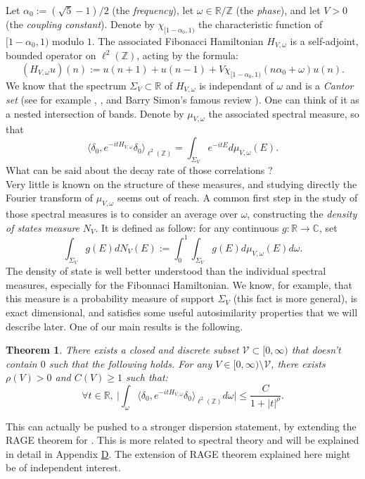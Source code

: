 \documentclass[a4paper]{article}
\newtheorem{theorem}{Theorem}[section]
\theoremstyle{definition}
\begin{document}
Let $\alpha_0 := (\sqrt{5}-1)/2$ (the \emph{frequency}), let $\omega \in \mathbb{R}/\mathbb{Z}$ (the \emph{phase}), and let $V>0$ (the \emph{coupling constant}). Denote by $\chi_{[1-\alpha_0,1)}$ the characteristic function of $[1-\alpha_0,1) \text{ modulo } 1$. The associated Fibonacci Hamiltonian $H_{V,\omega}$ is a self-adjoint, bounded operator on $\ell^2(\mathbb{Z})$, acting by the formula:
$$ (H_{V,\omega} u)(n) := u(n+1) + u(n-1) + V \chi_{[1-\alpha_0,1)}(n \alpha_0 + \omega)u(n). $$
We know that the spectrum $\Sigma_V \subset \mathbb{R}$ of $H_{V,\omega}$ is independant of $\omega$ and is a \emph{Cantor set} (see for example \cite{DF22}, \cite{DGY16}, and Barry Simon's famous review \cite{Si82}). One can think of it as a nested intersection of bands.
Denote by $\mu_{V,\omega}$ the associated spectral measure, so that
$$ \langle \delta_0, e^{-itH_{V,\omega}} \delta_0\rangle_{\ell^2(\mathbb{Z})} = \int_{\Sigma_{V}} e^{-i t E} d\mu_{V,\omega}(E). $$
What can be said about the decay rate of those correlations ? \\
Very little is known on the structure of these measures, and studying directly the Fourier transform of $\mu_{V,\omega}$ seems out of reach. A common first step in the study of those spectral measures is to consider an average over $\omega$, constructing the \emph{density of states measure} $N_V$. It is defined as follow: for any continuous $g:\mathbb{R} \rightarrow \mathbb{C}$, set
$$ \int_{\Sigma_V} g(E) dN_V(E) := \int_{0}^1 \int_{\Sigma_V} g(E) d\mu_{V,\omega}(E) d\omega. $$
The density of state is well better understood than the individual spectral measures, especially for the Fibonnaci Hamiltonian. We know, for example, that this measure is a probability measure of support $\Sigma_V$ (this fact is more general), is exact dimensional, and satisfies some useful autosimilarity properties that we will describe later. One of our main results is the following.

\begin{theorem}\label{th:IDS1}
There exists a closed and discrete subset $\mathcal{V}\subset [0,\infty)$ that doesn't contain $0$ such that the following holds. For any $V \in [0,\infty) \setminus \mathcal{V}$, there exists $\rho(V)>0$ and $C(V) \geq 1$ such that:
$$ \forall t \in \mathbb{R}, \ \Big| \int_\omega \langle \delta_0, e^{-it H_{V,\omega}} \delta_0 \rangle_{\ell^2(\mathbb{Z})} d\omega \Big| \leq \frac{C}{1+|t|^\rho}. $$
\end{theorem}

This can actually be pushed to a stronger dispersion statement, by extending the RAGE theorem for . This is more related to spectral theory and will be explained in detail in Appendix \hyperref[ap:D]{D}. The extension of RAGE theorem explained here might be of independent interest.
\end{document}
